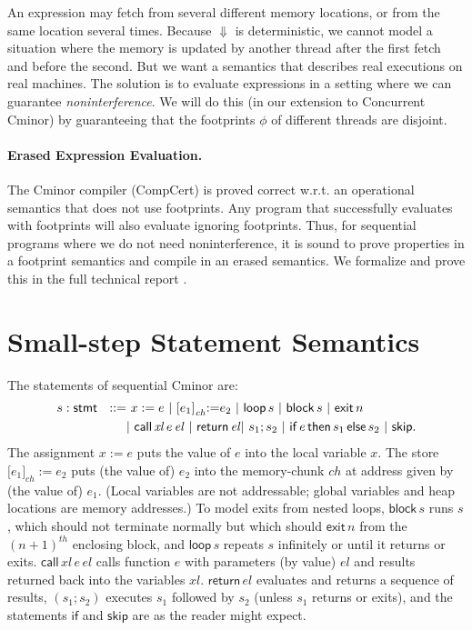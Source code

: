 \documentclass{llncs}
\newcommand{\cminor}{Cminor}
\newcommand{\tyface}[1]{\ensuremath{\mathsf{#1}}}
\newcommand{\Sassign}[2]{#1:=#2}
\newcommand{\Sstore}[3]{\tyface{[}#2\tyface{]}_{#1}\tyface{:=}#3}
\newcommand{\Scall}[4]{\tyface{call}\,#1\,#3\,#4}
\newcommand{\Sif}[3]{\tyface{if}\,#1\,\tyface{then}\,#2\,\tyface{else}\,#3}
\newcommand{\Sloop}[1]{\tyface{loop}\,#1}
\newcommand{\Sblock}[1]{\tyface{block}\,#1}
\newcommand{\Sexit}[1]{\tyface{exit}\,#1}
\newcommand{\Sreturn}[1]{\tyface{return}\,#1}
\newcommand{\Sseq}[2]{#1;#2}
\newcommand{\Sskip}{\tyface{skip}}
\begin{document}
An expression may fetch from several different memory
locations, or from the same location several times.  
Because $\Downarrow$ is deterministic, we cannot
model a situation where the memory is updated by another thread
after the first fetch and before the second.
But we want a semantics that describes real
executions on real machines.  The solution is to evaluate expressions
in a setting where we can guarantee \emph{noninterference}.
We will do this (in our extension to Concurrent \cminor)
by guaranteeing that the footprints $\phi$ of different
threads are disjoint.



\paragraph{Erased Expression Evaluation.}
The \cminor{} compiler (CompCert) is proved correct w.r.t. an operational semantics that does not use
footprints.
Any program that successfully evaluates with footprints will also evaluate ignoring footprints.
Thus, for sequential programs where we do not need noninterference,
it is sound to prove properties in a footprint semantics and compile in an erased semantics.  We formalize and prove this in the full technical report \cite{appel07:tr}.

\section{Small-step Statement Semantics}
The statements of sequential \cminor{} are:
\begin{align*}
s:\stmt ~  ~ ::= & ~ 
   \Sassign{x}{e} 
~|~ \Sstore{\mathit{ch}}{e_1}{e_2}
~ |~ \Sloop{s}
~|~ \Sblock{s}
~|~ \Sexit{n} \\
&|~ \Scall{\mathit{xl}}{\Sigma}{e}{\mathit{el}}
~|~ \Sreturn{\mathit{el}} 
|~ \Sseq{s_1}{s_2}
~|~ \Sif{e}{s_1}{s_2}
~|~ \Sskip. 
\end{align*}
The assignment $\Sassign{x}{e}$ puts the value of $e$ into the local variable $x$.
The store $\Sstore{\mathit{ch}}{e_1}{e_2}$ puts (the value of) $e_2$ into the
memory-chunk $\mathit{ch}$ at address given by (the value of) $e_1$.
(Local variables are not addressable; global variables and heap locations
are memory addresses.)
To model exits from nested loops,
$\Sblock{s}$ runs $s$, which should not terminate normally but
which should $\Sexit{n}$ from the $(n+1)^{th}$ enclosing block, and
$\Sloop{s}$ repeats $s$ infinitely or until it returns or exits.
$\Scall{\mathit{xl}}{\Sigma}{e}{\mathit{el}}$ 
calls function $e$ with parameters (by value) $\mathit{el}$
and results returned back into the variables $\mathit{xl}$.
$\Sreturn{\mathit{el}}$ evaluates and returns a sequence of results,
$(\Sseq{s_1}{s_2})$ executes $s_1$ followed by $s_2$ (unless 
$s_1$ returns or exits), and the statements
$\tyface{if}$ and $\Sskip$ are as the reader might expect.
\end{document}
